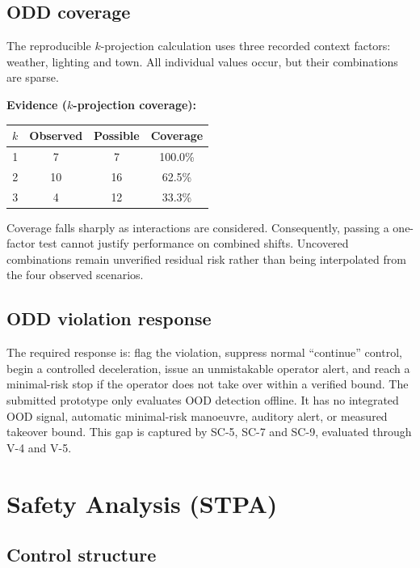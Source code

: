 \documentclass[nologo,a4paper,12pt]{article}
\begin{document}
\subsection{ODD coverage}

The reproducible $k$-projection calculation uses three recorded context factors: weather,
lighting and town. All individual values occur, but their combinations are sparse.

\begin{mdframed}[style=evidencestyle]
\textbf{Evidence ($k$-projection coverage):}
\begin{center}
\begin{tabular}{cccc}
\toprule
$k$ & Observed & Possible & Coverage \\
\midrule
1 & 7 & 7 & 100.0\% \\
2 & 10 & 16 & 62.5\% \\
3 & 4 & 12 & 33.3\% \\
\bottomrule
\end{tabular}
\end{center}
\end{mdframed}

Coverage falls sharply as interactions are considered. Consequently, passing a one-factor test
cannot justify performance on combined shifts. Uncovered combinations remain unverified residual
risk rather than being interpolated from the four observed scenarios.

\subsection{ODD violation response}

The required response is: flag the violation, suppress normal ``continue'' control, begin a
controlled deceleration, issue an unmistakable operator alert, and reach a minimal-risk stop if
the operator does not take over within a verified bound. The submitted prototype only evaluates
OOD detection offline. It has no integrated OOD signal, automatic minimal-risk manoeuvre,
auditory alert, or measured takeover bound. This gap is captured by SC-5, SC-7 and SC-9,
evaluated through V-4 and V-5.

\clearpage
\section{Safety Analysis (STPA)}
\label{sec:stpa}

\subsection{Control structure}
\end{document}
